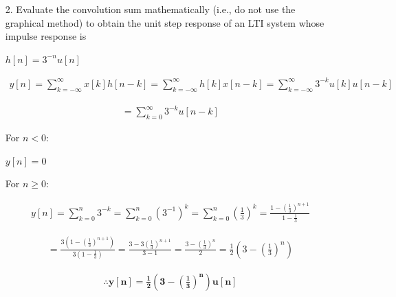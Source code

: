 \documentclass[fleqn]{article}
\begin{document}
\begin{enumerate}
		\item[2.] Evaluate the convolution sum mathematically (i.e., do not use the graphical method) to obtain the unit step response of an LTI system whose impulse response is
		
		$h[n] = 3^{-n}u[n]$
		
		\begin{align*}
			y[n] = \sum_{k = -\infty}^{\infty}{x[k]h[n-k]} = \sum_{k = -\infty}^{\infty}{h[k]x[n-k]} = \sum_{k = -\infty}^{\infty}{3^{-k}u[k]u[n-k]}
		\end{align*}
		
		\begin{align*}
			= \sum_{k = 0}^{\infty}{3^{-k}u[n-k]}
		\end{align*}
		
		For $n < 0$:
		
		$y[n] = 0$
		
		\break
		
		For $n \geq 0$:
		
		\begin{align*}
			y[n] = \sum_{k = 0}^{n}{3^{-k}} = \sum_{k = 0}^{n}{(3^{-1})^k} = \sum_{k = 0}^{n}{\left(\frac{1}{3}\right)^k} = \frac{1-\left(\frac{1}{3}\right)^{n+1}}{1-\frac{1}{3}}
		\end{align*}
		
		\begin{align*}
			 = \frac{3\left(1-\left(\frac{1}{3}\right)^{n+1}\right)}{3\left(1-\frac{1}{3}\right)} = \frac{3-3\left(\frac{1}{3}\right)^{n+1}}{3-1} = \frac{3-\left(\frac{1}{3}\right)^{n}}{2} = \frac{1}{2}\left(3-\left(\frac{1}{3}\right)^{n}\right)
		\end{align*}
		
		\begin{align*}
			\mathbf{\therefore y[n] = \frac{1}{2}\left(3-\left(\frac{1}{3}\right)^{n}\right)u[n]}
		\end{align*}
	\end{enumerate}
	
\end{document}
